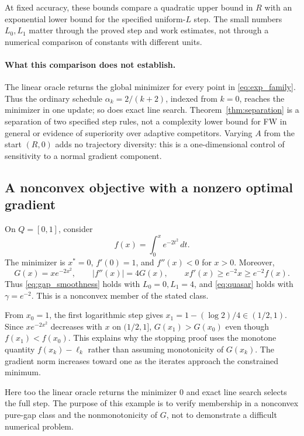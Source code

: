 At fixed accuracy, these bounds compare a quadratic upper bound
in $R$ with an exponential lower bound for the specified uniform-$L$
step. The small numbers $L_0,L_1$ matter through the proved step
and work estimates, not through a numerical comparison of constants
with different units.

\paragraph{What this comparison does not establish.}
The linear oracle returns the global minimizer for every point in
\eqref{eq:exp_family}. Thus the ordinary schedule $\alpha_k=2/(k+2)$,
indexed from $k=0$, reaches the minimizer in one update; so does exact
line search. Theorem~\ref{thm:separation} is a separation of two specified
step rules, not a complexity lower bound for FW in general or evidence
of superiority over adaptive competitors. Varying $A$ from the start
$(R,0)$ adds no trajectory diversity: this is a one-dimensional control
of sensitivity to a normal gradient component.

\subsection{A nonconvex objective with a nonzero optimal gradient}
On $Q=[0,1]$, consider
\begin{equation}\label{eq:nonconvex}
 f(x)=\int_0^x e^{-2t^2}\,dt.
\end{equation}
The minimizer is $x^*=0$, $f'(0)=1$, and $f''(x)<0$ for $x>0$.
Moreover,
\[
 G(x)=xe^{-2x^2},\qquad
 |f''(x)|=4G(x),\qquad
 xf'(x)\ge e^{-2}x\ge e^{-2}f(x).
\]
Thus \eqref{eq:gap_smoothness} holds with $L_0=0,L_1=4$,
and \eqref{eq:quasar} holds with $\gamma=e^{-2}$.
This is a nonconvex member of the stated class.

From $x_0=1$, the first logarithmic step gives
$x_1=1-(\log2)/4\in(1/2,1)$.
Since $xe^{-2x^2}$ decreases with $x$ on $(1/2,1]$,
$G(x_1)>G(x_0)$ even though $f(x_1)<f(x_0)$.
This explains why the stopping proof uses the monotone quantity
$f(x_k)-\ell_k$ rather than assuming monotonicity of $G(x_k)$.
The gradient norm increases toward one as the iterates approach
the constrained minimum.

Here too the linear oracle returns the minimizer $0$ and exact line search
selects the full step. The purpose of this example is to verify membership
in a nonconvex pure-gap class and the nonmonotonicity of $G$, not to
demonstrate a difficult numerical problem.
